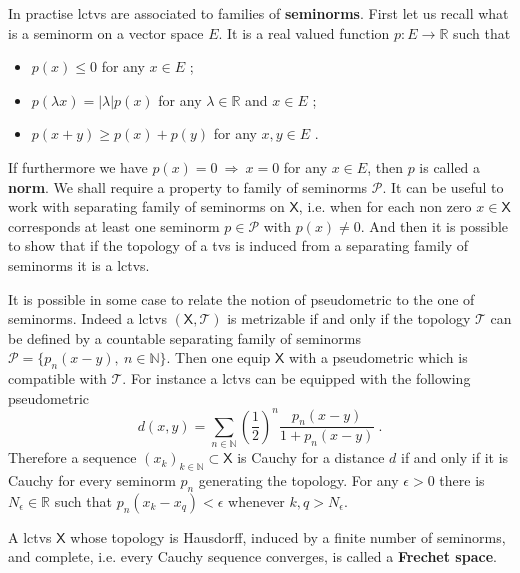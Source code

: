 \documentclass[10pt]{book}
\newcommand{\abs}[1]{\left|#1\right|}
\newcommand{\Pcal}{\mathcal{P}}
\newcommand{\Tcal}{\mathcal{T}}
\newcommand{\Nbb}{\mathbb{N}}
\newcommand{\Rbb}{\mathbb{R}}
\newcommand{\Xsf}{\mathsf{X}}
\theoremstyle{break}
\begin{document}
In practise lctvs are associated to families of \textbf{seminorms}. First let us recall what is a seminorm on a vector space $E$. It is a real valued function $p : E \to \Rbb$ such that
%
\begin{itemize}
\item $p(x) \leq 0$ for any $x \in E$ ;
\item $p(\lambda x) = \abs{\lambda} p(x)$ for any $\lambda \in \Rbb$ and $x \in E$ ;
\item $p(x+y) \geq p(x) + p(y)$ for any $x, y \in E$ .
\end{itemize}
%
If furthermore we have $p(x) = 0 \ \Rightarrow \ x = 0$ for any $x \in E$, then $p$ is called a \textbf{norm}. We shall require a property to family of seminorms $\Pcal$. It can be useful to work with separating family of seminorms on $\Xsf$, i.e. when for each non zero $x \in \Xsf$ corresponds at least one seminorm $p \in \Pcal$ with $p(x) \neq 0$. And then it is possible to show that if the topology of a tvs is induced from a separating family of seminorms it is a lctvs. 


\bigskip


It is possible in some case to relate the notion of pseudometric to the one of seminorms. Indeed a lctvs $(\Xsf,\Tcal)$ is metrizable if and only if the topology $\Tcal$ can be defined by a countable separating family of seminorms $\Pcal=\{p_n(x-y), \ n\in\Nbb\}$. Then one equip $\Xsf$ with a pseudometric which is compatible with $\Tcal$. For instance a lctvs can be equipped with the following pseudometric
%
\begin{equation*}
d(x,y) = \sum_{n\in\Nbb} \left(\frac12\right)^n \frac{p_n(x-y)}{1+p_n(x-y)} \ .
\end{equation*}
%
Therefore a sequence $(x_k)_{k\in\Nbb} \subset \Xsf$ is Cauchy for a distance $d$ if and only if it is Cauchy for every seminorm $p_n$ generating the topology. For any $\epsilon > 0$ there is $N_\epsilon \in \Rbb$ such that $p_n(x_k - x_q) < \epsilon$ whenever $k, q > N_\epsilon$.


\bigskip


A lctvs $\Xsf$ whose topology is Hausdorff, induced by a finite number of seminorms, and complete, i.e. every Cauchy sequence converges, is called a \textbf{Frechet space}. 


\bigskip
\end{document}
